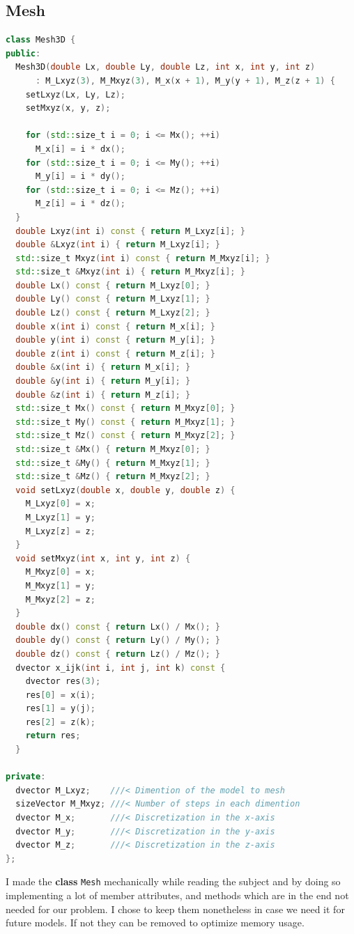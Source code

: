 \documentclass{article}
\begin{document}
\subsection{Mesh}
\begin{lstlisting}[language=c++]
class Mesh3D {
public:
  Mesh3D(double Lx, double Ly, double Lz, int x, int y, int z)
      : M_Lxyz(3), M_Mxyz(3), M_x(x + 1), M_y(y + 1), M_z(z + 1) {
    setLxyz(Lx, Ly, Lz);
    setMxyz(x, y, z);

    for (std::size_t i = 0; i <= Mx(); ++i)
      M_x[i] = i * dx();
    for (std::size_t i = 0; i <= My(); ++i)
      M_y[i] = i * dy();
    for (std::size_t i = 0; i <= Mz(); ++i)
      M_z[i] = i * dz();
  }
  double Lxyz(int i) const { return M_Lxyz[i]; }
  double &Lxyz(int i) { return M_Lxyz[i]; }
  std::size_t Mxyz(int i) const { return M_Mxyz[i]; }
  std::size_t &Mxyz(int i) { return M_Mxyz[i]; }
  double Lx() const { return M_Lxyz[0]; } 
  double Ly() const { return M_Lxyz[1]; } 
  double Lz() const { return M_Lxyz[2]; } 
  double x(int i) const { return M_x[i]; }
  double y(int i) const { return M_y[i]; }
  double z(int i) const { return M_z[i]; }
  double &x(int i) { return M_x[i]; }
  double &y(int i) { return M_y[i]; }
  double &z(int i) { return M_z[i]; }
  std::size_t Mx() const { return M_Mxyz[0]; } 
  std::size_t My() const { return M_Mxyz[1]; } 
  std::size_t Mz() const { return M_Mxyz[2]; } 
  std::size_t &Mx() { return M_Mxyz[0]; }      
  std::size_t &My() { return M_Mxyz[1]; }     
  std::size_t &Mz() { return M_Mxyz[2]; }     
  void setLxyz(double x, double y, double z) {
    M_Lxyz[0] = x;
    M_Lxyz[1] = y;
    M_Lxyz[z] = z;
  }
  void setMxyz(int x, int y, int z) {
    M_Mxyz[0] = x;
    M_Mxyz[1] = y;
    M_Mxyz[2] = z;
  }
  double dx() const { return Lx() / Mx(); }
  double dy() const { return Ly() / My(); }
  double dz() const { return Lz() / Mz(); }
  dvector x_ijk(int i, int j, int k) const {
    dvector res(3);
    res[0] = x(i);
    res[1] = y(j);
    res[2] = z(k);
    return res;
  }

private:
  dvector M_Lxyz;    ///< Dimention of the model to mesh
  sizeVector M_Mxyz; ///< Number of steps in each dimention
  dvector M_x;       ///< Discretization in the x-axis
  dvector M_y;       ///< Discretization in the y-axis
  dvector M_z;       ///< Discretization in the z-axis
};
\end{lstlisting}
I made the \textbf{class} \texttt{Mesh} mechanically while reading the subject and by doing so implementing a lot of member attributes, and methods which are in the end not needed for our problem. I chose to keep them nonetheless in case we need it for future models. If not they can be removed to optimize memory usage. 
\end{document}
